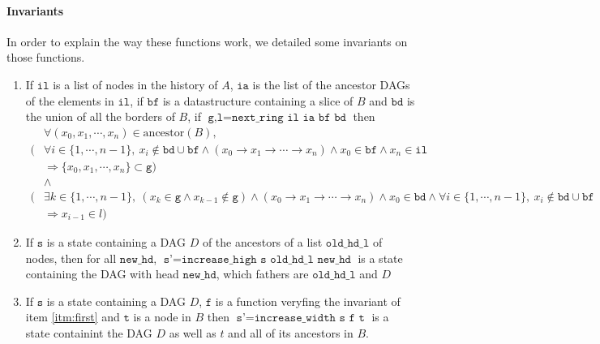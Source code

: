 \paragraph{Invariants} In order to explain the way these functions work, we detailed some invariants on those functions.
\begin{enumerate}
 \item \label{itm:first} If $\texttt{il}$ is a list of nodes in the history of $A$, $\texttt{ia}$ is the list of the ancestor DAGs of the elements in $\texttt{il}$, if $\texttt{bf}$ is a datastructure containing a slice of $B$ and $\texttt{bd}$ is the union of all the borders of $B$, if $\texttt{g,l} = \texttt{next\_ring il ia bf bd}$ then 
\begin{align*}
 &\forall (x_0,x_1,\cdots,x_n) \in \mathrm{ancestor}(B), \\
(
&\forall i \in \{1,\cdots,n-1\},\ x_i \notin \texttt{bd}\cup\texttt{bf} \wedge (x_0 \rightarrow x_1 \rightarrow \cdots \rightarrow x_n) \wedge x_0 \in \texttt{bf} \wedge x_n \in \texttt{il}
\\ &\Rightarrow \{x_0,x_1,\cdots,x_n\} \subset \texttt{g}
)\\
&\wedge \\
(
 &\exists k \in \{1,\cdots,n-1\},\ (x_k \in \texttt{g} \wedge x_{k-1} \notin \texttt{g}) \wedge (x_0 \rightarrow x_1 \rightarrow \cdots \rightarrow x_n) \wedge x_0 \in \texttt{bd} \wedge \forall i \in \{1,\cdots,n-1\},\ x_i \notin \texttt{bd}\cup\texttt{bf} \\
 &\Rightarrow x_{i-1} \in l
)
 \end{align*}
 \item If $\texttt{s}$ is a state containing a DAG $D$ of the ancestors of a list $\texttt{old\_hd\_l}$ of nodes, then for all $\texttt{new\_hd}$, $\texttt{s'} = \texttt{increase\_high s old\_hd\_l new\_hd}$ is a state containing the DAG with head $\texttt{new\_hd}$, which fathers are $\texttt{old\_hd\_l}$ and $D$
 \item If $\texttt{s}$ is a state containing a DAG $D$, $\texttt{f}$ is a function veryfing the invariant of item \ref{itm:first} and $\texttt{t}$ is a node in $B$ then $\texttt{s'} = \texttt{increase\_width s f t}$ is a state containint the DAG $D$ as well as $t$ and all of its ancestors in $B$.
\end{enumerate}
